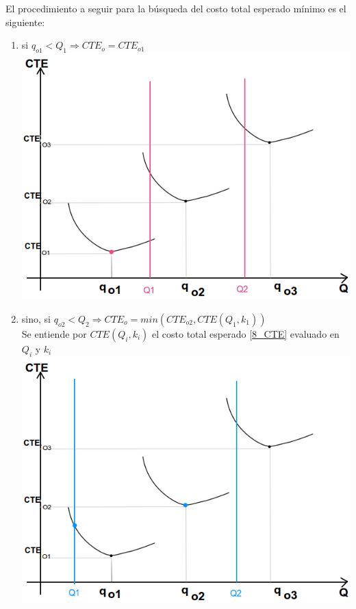 \documentclass{article}
\begin{document}
El procedimiento a seguir para la búsqueda del costo total esperado mínimo es el siguiente: 
\begin{enumerate}
 \item si $q_{o1} < Q_1 \Rightarrow CTE_o = CTE_{o1} $ \\
    \includegraphics[scale=0.5,keepaspectratio=true]{img/8/8_QvsCTE_1.png} 
 \item sino, si $q_{o2} < Q_2 \Rightarrow CTE_o = min( CTE_{o2}, CTE(Q_1, k_1)) $ \\
      Se entiende por $CTE(Q_i, k_i)$ el costo total esperado \eqref{8_CTE} evaluado en $Q_i$ y $k_i$ \\
      \includegraphics[scale=0.5,keepaspectratio=true]{img/8/8_QvsCTE_2.png} 

\end{enumerate}
\end{document}

